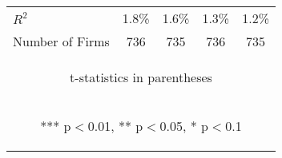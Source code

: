 \documentclass[border=0.2cm]{standalone}
\begin{document}
\begin{tabular}{lcccc}
    $R^2$               & 1.8\%                                          & 1.6\%                                          & 1.3\%                                          & 1.2\%                                          \\
    Number of Firms     & 736                                            & 735                                            & 736                                            & 735                                            \\
    \bottomrule
    \multicolumn{5}{c}{\begin{footnotesize} t-statistics in parentheses\end{footnotesize}}                                                                                                                                  \\
    \multicolumn{5}{c}{\begin{footnotesize} *** p$<$0.01, ** p$<$0.05, * p$<$0.1\end{footnotesize}}                                                                                                                         \\
\end{tabular}
\end{document}
